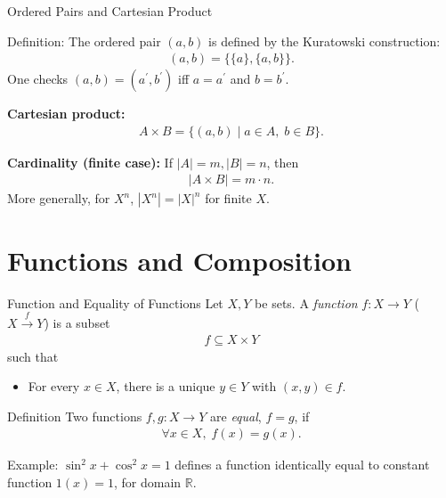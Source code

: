 \documentclass[11pt,aspectratio=43,ignorenonframetext,t]{beamer}
\begin{document}
\begin{frame}{Ordered Pairs and Cartesian Product}
\begin{block}{Definition:} The ordered pair \((a,b)\) is defined by the Kuratowski construction:
\begin{align*}
(a,b) = \{ \{a\}, \{a,b\} \}.
\end{align*}
One checks \((a,b) = (a^{'},b^{'})\) iff \(a=a^{'}\) and \(b=b^{'}\).

\medskip

\textbf{Cartesian product:}
\begin{align*}
A \times B = \{ (a,b) \mid a \in A,\; b \in B \}.
\end{align*}

\medskip

\textbf{Cardinality (finite case):} If \(|A| = m, |B| = n\), then
\begin{align*}
|A \times B| = m \cdot n.
\end{align*}
More generally, for \(X^n\), \(|X^n| = |X|^n\) for finite \(X\).
\end{block}
\end{frame}

\section{Functions and Composition}

\begin{frame}{Function and Equality of Functions}
Let \(X, Y\) be sets. A \emph{function} \(f: X \to Y\) ($X \xrightarrow{f} Y$) is a subset
\begin{align*}
f \subseteq X \times Y
\end{align*}
such that
\begin{itemize}
  \item For every \(x \in X\), there is a unique \(y \in Y\) with \((x,y) \in f\).
\end{itemize}

\medskip
\begin{block}{Definition}
Two functions \(f, g: X \to Y\) are \emph{equal}, \(f = g\), if
\begin{align*}
\forall x \in X,\; f(x) = g(x).
\end{align*}
\end{block}
\vspace{-0.5cm}

\begin{block}{Example:} \(\sin^2 x + \cos^2 x = 1\) defines a function identically equal to constant function \(1(x)=1\), for domain \(\mathbb{R}\).
\end{block}
\end{frame}
\end{document}
